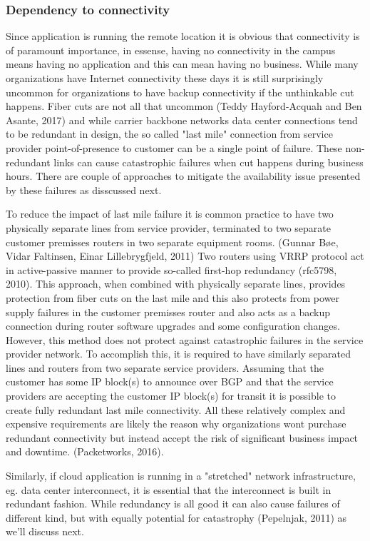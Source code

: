 \documentclass{article}
\begin{document}
\subsubsection{Dependency to connectivity}
Since application is running the remote location it is obvious that connectivity is of paramount importance, in essense, having no connectivity in the campus means having no application and this can mean having no business. While many organizations have Internet connectivity these days it is still surprisingly uncommon for organizations to have backup connectivity if the unthinkable cut happens. Fiber cuts are not all that uncommon (Teddy Hayford-Acquah and Ben Asante, 2017) and while carrier backbone networks data center connections tend to be redundant in design, the so called "last mile" connection from service provider point-of-presence to customer can be a single point of failure. These non-redundant links can cause catastrophic failures when cut happens during business hours. There are couple of approaches to mitigate the availability issue presented by these failures as disscussed next.
\par
To reduce the impact of last mile failure it is common practice to have two physically separate lines from service provider, terminated to two separate customer premisses routers in two separate equipment rooms. (Gunnar Bøe, Vidar Faltinsen, Einar Lillebrygfjeld, 2011) Two routers using VRRP protocol act in active-passive manner to provide so-called first-hop redundancy (rfc5798, 2010). This approach, when combined with physically separate lines, provides protection from fiber cuts on the last mile and this also protects from power supply failures in the customer premisses router and also acts as a backup connection during router software upgrades and some configuration changes.
However, this method does not protect against catastrophic failures in the service provider network. To accomplish this, it is required to have similarly separated lines and routers from two separate service providers. Assuming that the customer has some IP block(s) to announce over BGP and that the service providers are accepting the customer IP block(s) for transit it is possible to create fully redundant last mile connectivity. All these relatively complex and expensive requirements are likely the reason why organizations wont purchase redundant connectivity but instead accept the risk of significant business impact and downtime. (Packetworks, 2016).
\par
Similarly, if cloud application is running in a "stretched" network infrastructure, eg. data center interconnect, it is essential that the interconnect is built in redundant fashion. While redundancy is all good it can also cause failures of different kind, but with equally potential for catastrophy (Pepelnjak, 2011) as we'll discuss next. 
\end{document}
